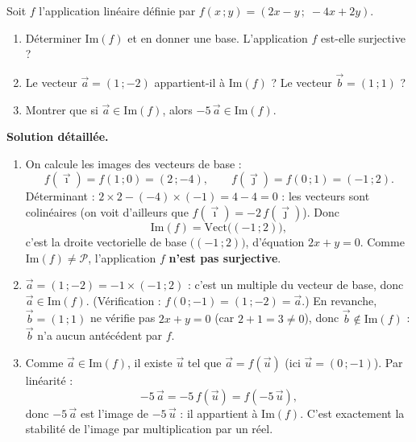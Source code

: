 \documentclass[11pt]{article}
\begin{document}
\begin{exoresolu}
Soit $f$ l'application linéaire définie par $f(x\,;y) = (2x - y\,;\; -4x + 2y)$.
\begin{enumerate}
\item Déterminer $\mathrm{Im}(f)$ et en donner une base. L'application $f$ est-elle surjective ?
\item Le vecteur $\vec{a} = (1\,;-2)$ appartient-il à $\mathrm{Im}(f)$ ? Le vecteur $\vec{b} = (1\,;1)$ ?
\item Montrer que si $\vec{a} \in \mathrm{Im}(f)$, alors $-5\,\vec{a} \in \mathrm{Im}(f)$.
\end{enumerate}
\tcblower
\textbf{Solution détaillée.}
\begin{enumerate}
\item On calcule les images des vecteurs de base :
\[ f(\vec{\imath}) = f(1\,;0) = (2\,;-4), \qquad f(\vec{\jmath}) = f(0\,;1) = (-1\,;2). \]
Déterminant : $2 \times 2 - (-4) \times (-1) = 4 - 4 = 0$ : les vecteurs sont colinéaires (on voit d'ailleurs que $f(\vec{\imath}) = -2\,f(\vec{\jmath})$). Donc
\[ \mathrm{Im}(f) = \mathrm{Vect}\bigl((-1\,;2)\bigr), \]
c'est la droite vectorielle de base $\bigl((-1\,;2)\bigr)$, d'équation $2x + y = 0$. Comme $\mathrm{Im}(f) \neq \mathcal{P}$, l'application $f$ \textbf{n'est pas surjective}.
\item $\vec{a} = (1\,;-2) = -1 \times (-1\,;2)$ : c'est un multiple du vecteur de base, donc $\vec{a} \in \mathrm{Im}(f)$. (Vérification : $f(0\,;-1) = (1\,;-2) = \vec{a}$.) En revanche, $\vec{b} = (1\,;1)$ ne vérifie pas $2x + y = 0$ (car $2 + 1 = 3 \neq 0$), donc $\vec{b} \notin \mathrm{Im}(f)$ : $\vec{b}$ n'a aucun antécédent par $f$.
\item Comme $\vec{a} \in \mathrm{Im}(f)$, il existe $\vec{u}$ tel que $\vec{a} = f(\vec{u})$ (ici $\vec{u} = (0\,;-1)$). Par linéarité :
\[ -5\,\vec{a} = -5\,f(\vec{u}) = f(-5\,\vec{u}), \]
donc $-5\,\vec{a}$ est l'image de $-5\,\vec{u}$ : il appartient à $\mathrm{Im}(f)$. C'est exactement la stabilité de l'image par multiplication par un réel.
\end{enumerate}
\end{exoresolu}
\end{document}
